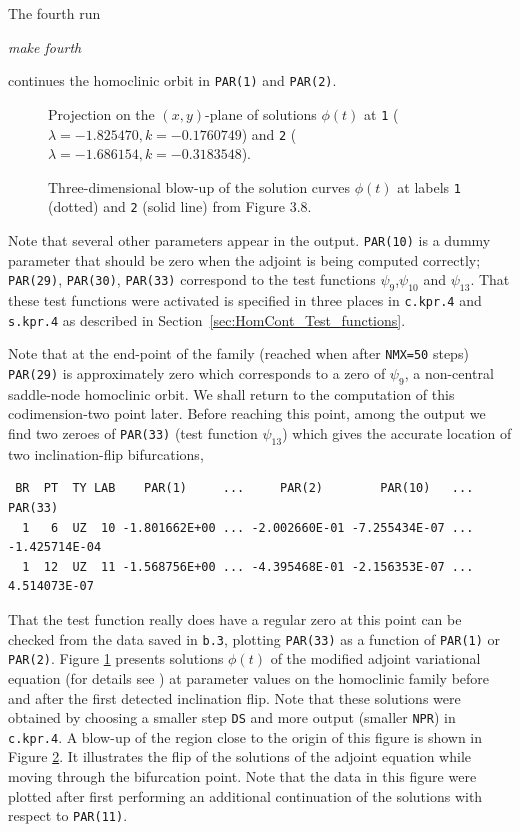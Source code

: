 \documentclass[12pt]{report}
\begin{document}
The fourth run
\begin{center}
{\it make fourth}
\end{center}
continues the homoclinic orbit in {\tt PAR(1)} and {\tt PAR(2)}. 
%
\begin{figure}[p]
\epsfysize 9.0cm
\centerline{}
\caption{Projection on the $(x,y)$-plane of solutions $\phi(t)$
at {\tt 1} ($\lambda=-1.825470, k=-0.1760749$) and
{\tt 2} ($\lambda=-1.686154, k=-0.3183548$).}
\label{kf.2a}
\end{figure}
\begin{figure}[p]
\epsfysize 8.0cm
\centerline{}
\caption{Three-dimensional blow-up of the solution curves
 $\phi(t)$ 
at labels {\tt 1} (dotted) and {\tt 2} (solid line) from Figure 3.8.}
\label{kf.2b}
\end{figure}
%
Note that several other parameters appear in
the output. {\tt PAR(10)} is a dummy parameter
that should be zero when the adjoint is being computed correctly;
{\tt PAR(29)}, {\tt PAR(30)}, {\tt PAR(33)} correspond to the
test functions $\psi_9$,$\psi_{10}$ and $\psi_{13}$. 
That these test functions were activated is specified
in three places in {\tt c.kpr.4} and {\tt s.kpr.4} 
as described in Section~\ref{sec:HomCont_Test_functions}.  

Note that at the end-point of
the family (reached when after {\tt NMX=50} steps) {\tt PAR(29)} is
approximately zero which corresponds to a zero of $\psi_9$, a 
non-central saddle-node homoclinic orbit. We shall return to the computation of
this codimension-two point later. Before reaching this point,
among the output we find two zeroes of {\tt PAR(33)}
(test function $\psi_{13}$) which gives the accurate
location of two inclination-flip bifurcations,
\begin{verbatim}
 BR  PT  TY LAB    PAR(1)     ...     PAR(2)        PAR(10)   ...    PAR(33)  
  1   6  UZ  10 -1.801662E+00 ... -2.002660E-01 -7.255434E-07 ... -1.425714E-04
  1  12  UZ  11 -1.568756E+00 ... -4.395468E-01 -2.156353E-07 ...  4.514073E-07
\end{verbatim}
That the test function really does have a regular zero at this point can
be checked from the data saved in {\tt b.3}, plotting {\tt PAR(33)} as
a function of {\tt PAR(1)} or {\tt PAR(2)}. 
Figure \ref{kf.2a} presents solutions $\phi(t)$ of the modified adjoint 
variational equation (for details see )
at parameter values on the homoclinic 
family before and after the first detected inclination flip. 
Note that these solutions were obtained by choosing a smaller
step {\tt DS} and more output (smaller {\tt NPR}) in
{\tt c.kpr.4}.
A blow-up of the region close to the origin of this 
figure is shown in Figure \ref{kf.2b}.
It illustrates the flip of the solutions of the adjoint equation while
moving through the bifurcation point. Note that the data in this
figure were plotted after first performing an additional
continuation of the solutions with respect to {\tt PAR(11)}. 
\end{document}

